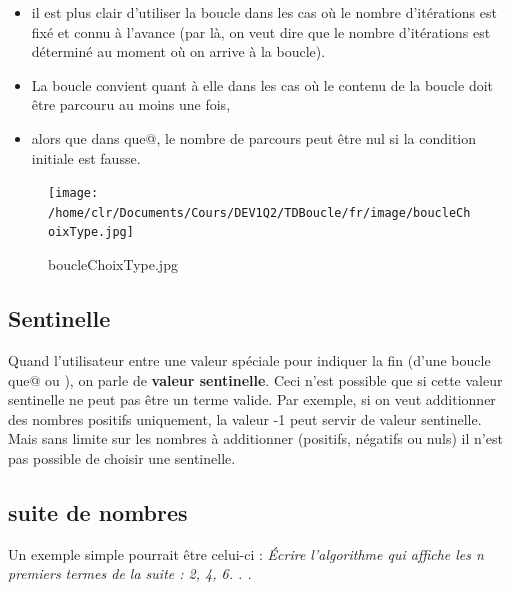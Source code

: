 \documentclass[11pt,a4paper]{article}
\begin{document}
					\begin{itemize}
				
			\item 
              il est plus clair d'utiliser la boucle \verb@pour@ 
              dans les cas o\`u le nombre d'it\'erations est fix\'e et connu \`a l'avance
              (par l\`a, on veut dire que le nombre d'it\'erations est d\'etermin\'e au moment o\`u on arrive \`a la boucle). 
            
			\item 
              La boucle \verb@faire@ convient quant \`a elle dans les cas o\`u le contenu de la boucle doit \^etre parcouru au moins une fois,
            
			\item 
              alors que dans \verb@tant que@, le nombre de parcours peut \^etre nul si la condition initiale est fausse.
            
					\end{itemize}
				
            \par
        \begin{figure}[hbt]
				    \begin{center}
					\texttt{[image: /home/clr/Documents/Cours/DEV1Q2/TDBoucle/fr/image/boucleChoixType.jpg]}
						\end{center}
                
                    \caption[boucleChoixType.jpg]{boucleChoixType.jpg}
                \end{figure}
                    
            \par
        \subsection{Sentinelle}
      Quand l'utilisateur entre une valeur sp\'eciale pour indiquer la fin 
      (d'une boucle \verb@tant que@ ou \verb@faire@), 
      on parle de\textbf{ valeur sentinelle}.
      Ceci n'est possible que si cette valeur sentinelle ne peut pas \^etre un terme valide. 
      Par exemple, si on veut additionner des nombres positifs uniquement, la valeur -1 peut
      servir de valeur sentinelle. Mais sans limite sur les nombres \`a additionner (positifs, n\'egatifs
      ou nuls) il n'est pas possible de choisir une sentinelle.
    \subsection{suite de nombres}
		    Un exemple simple pourrait \^etre celui-ci : 
		    \guillemotleft  \textit{\'Ecrire l'algorithme qui affiche les n premiers
        termes de la suite : 2, 4, 6. . . }\guillemotright 
      
\end{document}

